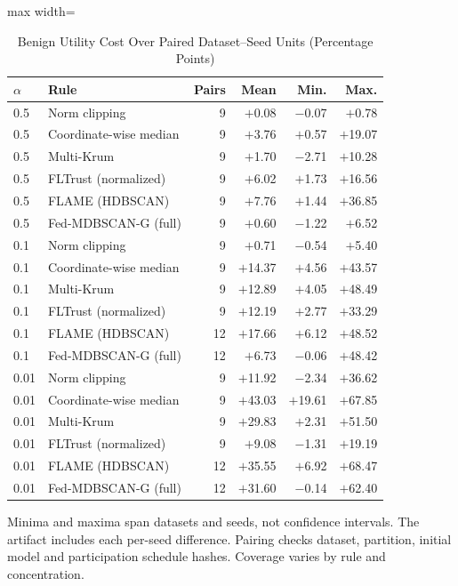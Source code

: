\begin{table}[!t]
\centering\footnotesize
\setlength{\tabcolsep}{4pt}
\caption{Benign Utility Cost Over Paired Dataset--Seed Units (Percentage Points)}\label{tab:seed_cost}
\begin{adjustbox}{max width=\columnwidth}
\begin{tabular}{llrrrr}
\toprule
$\alpha$ & Rule & Pairs & Mean & Min. & Max. \\
\midrule
0.5 & Norm clipping & 9 & $+$0.08 & $-$0.07 & $+$0.78 \\
0.5 & Coordinate-wise median & 9 & $+$3.76 & $+$0.57 & $+$19.07 \\
0.5 & Multi-Krum & 9 & $+$1.70 & $-$2.71 & $+$10.28 \\
0.5 & FLTrust (normalized) & 9 & $+$6.02 & $+$1.73 & $+$16.56 \\
0.5 & FLAME (HDBSCAN) & 9 & $+$7.76 & $+$1.44 & $+$36.85 \\
0.5 & Fed-MDBSCAN-G (full) & 9 & $+$0.60 & $-$1.22 & $+$6.52 \\
0.1 & Norm clipping & 9 & $+$0.71 & $-$0.54 & $+$5.40 \\
0.1 & Coordinate-wise median & 9 & $+$14.37 & $+$4.56 & $+$43.57 \\
0.1 & Multi-Krum & 9 & $+$12.89 & $+$4.05 & $+$48.49 \\
0.1 & FLTrust (normalized) & 9 & $+$12.19 & $+$2.77 & $+$33.29 \\
0.1 & FLAME (HDBSCAN) & 12 & $+$17.66 & $+$6.12 & $+$48.52 \\
0.1 & Fed-MDBSCAN-G (full) & 12 & $+$6.73 & $-$0.06 & $+$48.42 \\
0.01 & Norm clipping & 9 & $+$11.92 & $-$2.34 & $+$36.62 \\
0.01 & Coordinate-wise median & 9 & $+$43.03 & $+$19.61 & $+$67.85 \\
0.01 & Multi-Krum & 9 & $+$29.83 & $+$2.31 & $+$51.50 \\
0.01 & FLTrust (normalized) & 9 & $+$9.08 & $-$1.31 & $+$19.19 \\
0.01 & FLAME (HDBSCAN) & 12 & $+$35.55 & $+$6.92 & $+$68.47 \\
0.01 & Fed-MDBSCAN-G (full) & 12 & $+$31.60 & $-$0.14 & $+$62.40 \\
\bottomrule
\end{tabular}
\end{adjustbox}

\par\vspace{3pt}\parbox{\linewidth}{\footnotesize Minima and maxima span datasets and seeds, not confidence intervals. The artifact includes each per-seed difference. Pairing checks dataset, partition, initial model and participation schedule hashes. Coverage varies by rule and concentration.}
\end{table}
